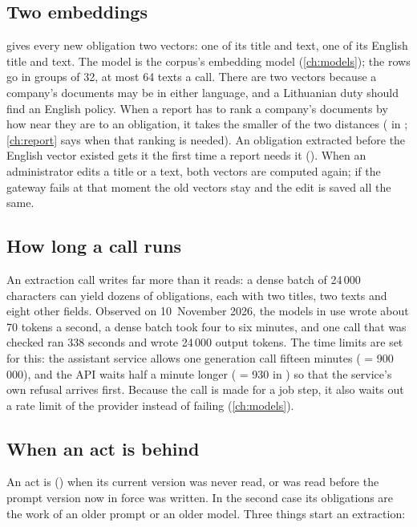 \subsection{Two embeddings}\label{sec:obligations:embeddings}

 gives every new obligation two vectors: one of its title and text,
one of its English title and text. The model is the corpus's embedding model
(\cref{ch:models}); the rows go in groups of 32, at most 64 texts a call. There are two
vectors because a company's documents may be in either language, and a Lithuanian duty should
find an English policy. When a report has to rank a company's documents by how near they are
to an obligation, it takes the smaller of the two distances ( in
; \cref{ch:report} says when that ranking is needed). An
obligation extracted before the English vector existed gets it the first time a report needs
it (). When an administrator edits a title or a text, both vectors are
computed again; if the gateway fails at that moment the old vectors stay and the edit is
saved all the same.

\subsection{How long a call runs}

An extraction call writes far more than it reads: a dense batch of 24\,000 characters can
yield dozens of obligations, each with two titles, two texts and eight other fields. Observed
on 10~November 2026, the models in use wrote about 70 tokens a second, a dense batch took four
to six minutes, and one call that was checked ran 338 seconds and wrote 24\,000 output tokens.
The time limits are set for this: the assistant service allows one generation call fifteen
minutes ( = 900\,000), and the API waits half a minute longer
( = 930 in ) so that the service's own
refusal arrives first. Because the call is made for a job step, it also waits out a rate limit
of the provider instead of failing (\cref{ch:models}).

\subsection{When an act is behind}\label{sec:obligations:behind}

An act is  () when its current version was never read, or was
read before the prompt version now in force was written. In the second case its obligations
are the work of an older prompt or an older model. Three things start an extraction:

